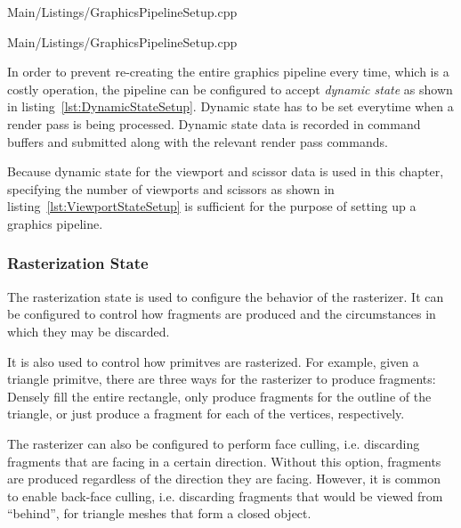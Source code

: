         
        {Main/Listings/GraphicsPipelineSetup.cpp}

        
        {Main/Listings/GraphicsPipelineSetup.cpp}

        In order to prevent re-creating the entire graphics pipeline every time, which is a costly operation, the pipeline can be configured to accept \textit{dynamic state} as shown in listing~\ref{lst:DynamicStateSetup}.
        Dynamic state has to be set everytime when a render pass is being processed.
        Dynamic state data is recorded in command buffers and submitted along with the relevant render pass commands.

        Because dynamic state for the viewport and scissor data is used in this chapter, specifying the number of viewports and scissors as shown in listing~\ref{lst:ViewportStateSetup} is sufficient for the purpose of setting up a graphics pipeline.

      \subsubsection{Rasterization State}
        The rasterization state is used to configure the behavior of the rasterizer.
        It can be configured to control how fragments are produced and the circumstances in which they may be discarded.

        It is also used to control how primitves are rasterized.
        For example, given a triangle primitve, there are three ways for the rasterizer to produce fragments: Densely fill the entire rectangle, only produce fragments for the outline of the triangle, or just produce a fragment for each of the vertices, respectively.

        The rasterizer can also be configured to perform face culling, i.e. discarding fragments that are facing in a certain direction.
        Without this option, fragments are produced regardless of the direction they are facing.
        However, it is common to enable back-face culling, i.e. discarding fragments that would be viewed from ``behind'', for triangle meshes that form a closed object.

